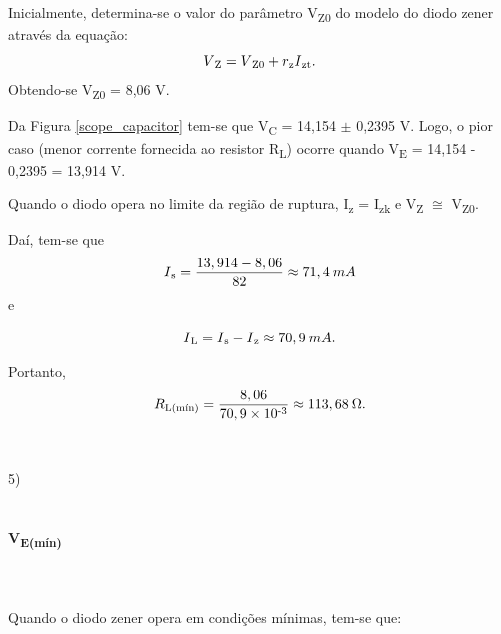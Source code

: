 \documentclass[journal, a4paper]{IEEEtran}
\begin{document}
        \tab Inicialmente, determina-se o valor do parâmetro V\textsubscript{Z0} do modelo do diodo zener através da equação: \begin{equation}
            V\textsubscript{Z} = V\textsubscript{Z0} + r\textsubscript{z}  I\textsubscript{zt}.
        \end{equation}
        \tab Obtendo-se  V\textsubscript{Z0} = 8,06 V.
        
        \tab Da Figura \ref{scope_capacitor} tem-se que V\textsubscript{C} = 14,154 $\pm$ 0,2395 V. Logo, o pior caso (menor corrente fornecida ao resistor  R\textsubscript{L}) ocorre quando  V\textsubscript{E} = 14,154 - 0,2395 = 13,914 V.
        
        \tab Quando o diodo opera no limite da região de ruptura,  I\textsubscript{z} =  I\textsubscript{zk} e  V\textsubscript{Z} $\cong$  V\textsubscript{Z0}.
        
        \tab Daí, tem-se que 
            \begin{equation}
                 I\textsubscript{s} = \frac{13,914 - 8,06}{82} \approx 71,4 \:mA
            \end{equation}  e 
                
             \begin{equation}
                 I\textsubscript{L} =  I\textsubscript{s} -  I\textsubscript{z} \approx 70,9\: mA.
            \end{equation}
        
        \tab Portanto, \begin{equation}
            R\textsubscript{L(mín)} = \frac{8,06}{70,9 \times 10\textsuperscript{-3}} \approx 113,68 \: \Omega.
        \end{equation} 
\\~\\    
    5)
\\~\\
    \paragraph{V\textsubscript{E(mín)}}
\\~\\    
    \tab Quando o diodo zener opera em condições mínimas, tem-se que:
     
\end{document}
